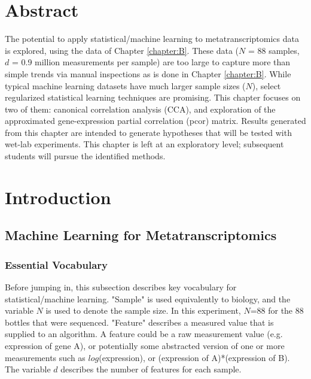 
\section{Abstract}

The potential to apply statistical/machine learning to metatranscriptomics data is explored, using the data of Chapter \ref{chapter:B}.
These data ($N$  = 88 samples, $d$ = 0.9 million measurements per sample) are too large to capture more than simple trends via manual inspections as is done in Chapter \ref{chapter:B}.
While typical machine learning datasets have much larger sample sizes ($N$), select regularized statistical learning techniques are promising.
This chapter focuses on two of them: canonical correlation analysis (CCA), and exploration of the approximated gene-expression partial correlation (pcor) matrix.
Results generated from this chapter are intended to generate hypotheses that will be tested with wet-lab experiments.
This chapter is left at an exploratory level; subsequent students will pursue the identified methods.


\section{Introduction}

\subsection{Machine Learning for Metatranscriptomics}

\subsubsection{Essential Vocabulary}

Before jumping in, this subsection describes key vocabulary for statistical/machine learning.
"Sample" is used equivalently to biology, and the variable $N$ is used to denote the sample size.
In this experiment, $N$=88 for the 88 bottles that were sequenced.
"Feature" describes a measured value that is supplied to an algorithm.
A feature could be a raw measurement value (e.g. expression of gene A), or potentially some abstracted version of one or more measurements such as $log$(expression), or (expression of A)*(expression of B).
The variable $d$ describes the number of features for each sample.

